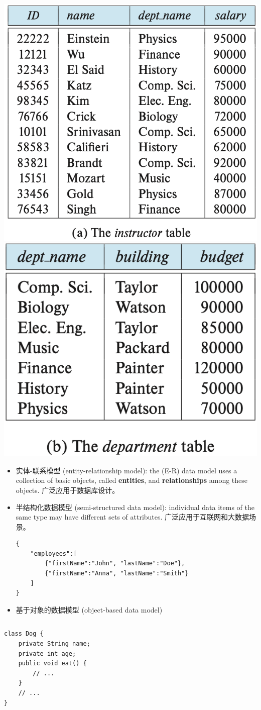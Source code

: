 \documentclass[aspectratio=169, 14pt]{beamer}
\begin{document}
\begin{frame}

\includegraphics[width=.475\textwidth]{table/instructor}    
\includegraphics[width=.475\textwidth]{table/department} 
\end{frame}

\begin{frame}[fragile]
\begin{itemize}
    \item<1-> 实体-联系模型 (entity-relationship model): the (E-R) data model uses a collection of basic objects, called \textbf{entities}, and \textbf{relationships} among these objects. \alert{广泛应用于数据库设计}。
    \item<2-> 半结构化数据模型 (semi-structured data model): individual data items of the same type may have different sets of attributes. \alert{广泛应用于互联网和大数据场景}。 
    \begin{verbatim}
{
    "employees":[
        {"firstName":"John", "lastName":"Doe"},
        {"firstName":"Anna", "lastName":"Smith"}
    ]
}                    
    \end{verbatim}
\end{itemize}
\end{frame}

\begin{frame}[fragile]
\begin{itemize}
    \item 基于对象的数据模型 (object-based data model)
\end{itemize}

\begin{columns}
    {\Huge {}}
    \begin{verbatim}
class Dog {
    private String name;
    private int age;
    public void eat() {
        // ...
    }
    // ...
}
    \end{verbatim} 
\end{columns}
\end{frame}
\end{document}
